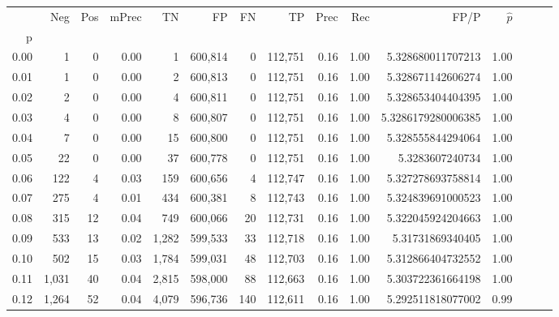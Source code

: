 \begin{tabular}{rrrrrrrrrrrrrrr}
\toprule
{} &     Neg &    Pos & mPrec &       TN &       FP &       FN &       TP &  Prec &   Rec &                    FP/P & $\hat{p}$ \\
p    &         &        &       &          &          &          &          &       &       &                         &           \\
\midrule
0.00 &       1 &      0 &  0.00 &        1 &  600,814 &        0 &  112,751 &  0.16 &  1.00 &       5.328680011707213 &      1.00 \\
0.01 &       1 &      0 &  0.00 &        2 &  600,813 &        0 &  112,751 &  0.16 &  1.00 &       5.328671142606274 &      1.00 \\
0.02 &       2 &      0 &  0.00 &        4 &  600,811 &        0 &  112,751 &  0.16 &  1.00 &       5.328653404404395 &      1.00 \\
0.03 &       4 &      0 &  0.00 &        8 &  600,807 &        0 &  112,751 &  0.16 &  1.00 &      5.3286179280006385 &      1.00 \\
0.04 &       7 &      0 &  0.00 &       15 &  600,800 &        0 &  112,751 &  0.16 &  1.00 &       5.328555844294064 &      1.00 \\
0.05 &      22 &      0 &  0.00 &       37 &  600,778 &        0 &  112,751 &  0.16 &  1.00 &         5.3283607240734 &      1.00 \\
0.06 &     122 &      4 &  0.03 &      159 &  600,656 &        4 &  112,747 &  0.16 &  1.00 &       5.327278693758814 &      1.00 \\
0.07 &     275 &      4 &  0.01 &      434 &  600,381 &        8 &  112,743 &  0.16 &  1.00 &       5.324839691000523 &      1.00 \\
0.08 &     315 &     12 &  0.04 &      749 &  600,066 &       20 &  112,731 &  0.16 &  1.00 &       5.322045924204663 &      1.00 \\
0.09 &     533 &     13 &  0.02 &    1,282 &  599,533 &       33 &  112,718 &  0.16 &  1.00 &        5.31731869340405 &      1.00 \\
0.10 &     502 &     15 &  0.03 &    1,784 &  599,031 &       48 &  112,703 &  0.16 &  1.00 &       5.312866404732552 &      1.00 \\
0.11 &   1,031 &     40 &  0.04 &    2,815 &  598,000 &       88 &  112,663 &  0.16 &  1.00 &       5.303722361664198 &      1.00 \\
0.12 &   1,264 &     52 &  0.04 &    4,079 &  596,736 &      140 &  112,611 &  0.16 &  1.00 &       5.292511818077002 &      0.99 \\

\end{tabular}
